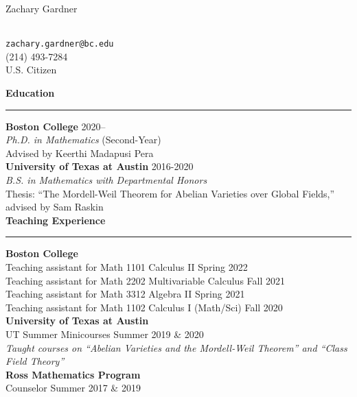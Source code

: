 \documentclass[11pt]{article}
\newenvironment{mysection}{
\color{mygreen}\bfseries\large
}
{
\\ \rule{\textwidth}{1pt}\hspace{-.25em}
} %
\begin{document}
\begin{center}
\begin{LARGE}Zachary Gardner\end{LARGE} \\
\vspace{1em}
\texttt{zachary.gardner@bc.edu} \\
(214) 493-7284 \\
U.S. Citizen \\
\end{center}

\begin{mysection}Education\end{mysection}
\textbf{Boston College} \hfill 2020-- \\
\textit{Ph.D. in Mathematics} (Second-Year) \\
Advised by Keerthi Madapusi Pera \\

\textbf{University of Texas at Austin} \hfill 2016-2020 \\
\textit{B.S. in Mathematics with Departmental Honors} \\
Thesis: ``The Mordell-Weil Theorem for Abelian Varieties over Global Fields,'' advised by Sam Raskin \\

\begin{mysection}Teaching Experience\end{mysection}
\textbf{Boston College} \\
Teaching assistant for Math 1101 Calculus II \hfill Spring 2022 \\
Teaching assistant for Math 2202 Multivariable Calculus \hfill Fall 2021 \\
Teaching assistant for Math 3312 Algebra II \hfill Spring 2021 \\
Teaching assistant for Math 1102 Calculus I (Math/Sci) \hfill Fall 2020 \\

\textbf{University of Texas at Austin} \\
UT Summer Minicourses \hfill Summer 2019 \& 2020 \\
\textit{Taught courses on ``Abelian Varieties and the Mordell-Weil Theorem'' and ``Class Field Theory''} \\

\textbf{Ross Mathematics Program} \\
Counselor \hfill Summer 2017 \& 2019 \\
\end{document}
